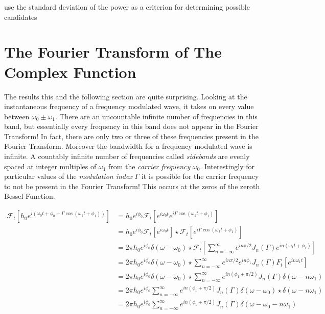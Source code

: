 \documentclass[onecolumn, groupedaddress, 10pt]{revtex4-1}
\begin{document}
use the standard deviation of the power as a criterion for determining possible candidates



\appendix
\section{The Fourier Transform of The Complex Function}
The results this and the following section are quite surprising.  Looking at the instantaneous frequency of a frequency modulated wave, it takes on every value between $\omega_0 \pm \omega_1$.  There are an uncountable infinite number of frequencies in this band, but essentially every frequency in this band does not appear in the Fourier Transform!  In fact, there are only two or three of these frequencies present in the Fourier Transform.  Moreover the bandwidth for a frequency modulated wave is infinite.  A countably infinite number of frequencies called \textit{sidebands} are evenly spaced at integer multiples of $\omega_1$ from the \textit{carrier frequency} $\omega_0$.  Interestingly for particular values of the \textit{modulation index} $\Gamma$ it is possible for the carrier frequency to not be present in the Fourier Transform!  This occurs at the zeros of the zeroth Bessel Function.

\begin{align}
\mathcal{F}_t \left[ h_0 e^{i\left( \omega_0 t + \phi_0 + \Gamma \cos( \omega_1 t + \phi_1 ) \right)} \right]
&= h_0 e^{i\phi_0} \mathcal{F}_t \left[ e^{i\omega_0 t} e^{i\Gamma \cos(\omega_1 t + \phi_1)} \right]											\\
&= h_0 e^{i\phi_0} \mathcal{F}_t \left[ e^{i\omega_0 t} \right] \star \mathcal{F}_t \left[ e^{i\Gamma \cos(\omega_1 t + \phi_1)} \right]		\\
&= 2 \pi h_0 e^{i\phi_0} \delta(\omega - \omega_0) 
			\star \mathcal{F}_t \left[ \sum_{n=-\infty}^{\infty} e^{in\pi/2} J_n(\Gamma) e^{in(\omega_1 t + \phi_1)} \right]							\\
&= 2 \pi h_0 e^{i\phi_0} \delta(\omega - \omega_0) \star \sum_{n=-\infty}^{\infty} e^{in\pi/2} e^{in\phi_1} J_n(\Gamma) F_t \left[ e^{in\omega_1 t} \right]	\\
&= 2 \pi h_0 e^{i\phi_0} \delta(\omega - \omega_0) \star \sum_{n=-\infty}^{\infty} e^{in(\phi_1 + \pi/2)} J_n(\Gamma) \delta(\omega - n\omega_1)			\\
&= 2 \pi h_0 e^{i\phi_0} \sum_{n=-\infty}^{\infty} e^{in(\phi_1 + \pi/2)} J_n(\Gamma)  \delta(\omega - \omega_0) \star \delta(\omega - n\omega_1)			\\
&= 2 \pi h_0 e^{i\phi_0} \sum_{n=-\infty}^{\infty} e^{in(\phi_1 + \pi/2)} J_n(\Gamma)  \delta(\omega - \omega_0 - n\omega_1)
\end{align}
\end{document}
